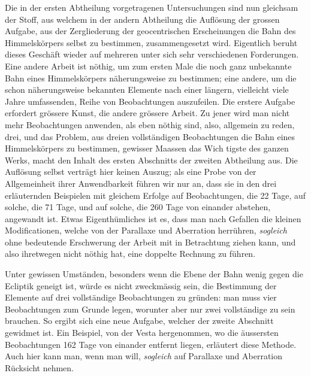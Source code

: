Die in der ersten Abtheilung vorgetragenen Untersuchungen sind nun gleichsam der Stoff, aus welchem in der andern Abtheilung die Auflösung der grossen Aufgabe, aus der Zergliederung der geocentrischen Erscheinungen die Bahn des Himmelskörpers selbst zu bestimmen, zusammengesetzt wird. Eigentlich beruht dieses Geschäft wieder auf mehreren unter sich sehr verschiedenen Forderungen. Eine andere Arbeit ist nöthig, um zum ersten Male die noch ganz unbekannte Bahn eines Himmelskörpers näherungsweise zu bestimmen; eine andere, um die schon näherungsweise bekannten Elemente nach einer längern, vielleicht viele Jahre umfassenden, Reihe von Beobachtungen auszufeilen. Die erstere Aufgabe erfordert grössere Kunst, die andere grössere Arbeit. Zu jener wird man nicht mehr Beobachtungen anwenden, als eben nöthig sind, also, allgemein zu reden, drei, und das Problem, aus dreien vollständigen Beobachtungen die Bahn eines Himmelskörpers zu bestimmen, gewisser Maassen das Wich%
%
tigste des ganzen Werks, macht den Inhalt des ersten Abschnitts der zweiten
Abtheilung aus. Die Auflösung selbst verträgt hier keinen Auszug; als eine
Probe von der Allgemeinheit ihrer Anwendbarkeit führen wir nur an, dass sie
in den drei erläuternden Beispielen mit gleichem Erfolge auf Beobachtungen,
die 22 Tage, auf solche, die 71 Tage, und auf solche, die 260 Tage von einander
abstehen, angewandt ist. Etwas Eigenthümliches ist es, dass man nach
Gefallen die kleinen Modificationen, welche von der Parallaxe und Aberration
herrühren, \textit{sogleich} ohne bedeutende Erschwerung der Arbeit mit in Betrachtung
ziehen kann, und also ihretwegen nicht nöthig hat, eine doppelte Rechnung zu
führen.

Unter gewissen Umständen, besonders wenn die Ebene der Bahn wenig
gegen die Ecliptik geneigt ist, würde es nicht zweckmässig sein, die Bestimmung
der Elemente auf drei vollständige Beobachtungen zu gründen: man muss
vier Beobachtungen zum Grunde legen, worunter aber nur zwei vollständige zu
sein brauchen. So ergibt sich eine neue Aufgabe, welcher der zweite Abschnitt
gewidmet ist. Ein Beispiel, von der Vesta hergenommen, wo die äussersten Beobachtungen
162 Tage von einander entfernt liegen, erläutert diese Methode.
Auch hier kann man, wenn man will, \textit{sogleich} auf Parallaxe und Aberration
Rücksicht nehmen.

